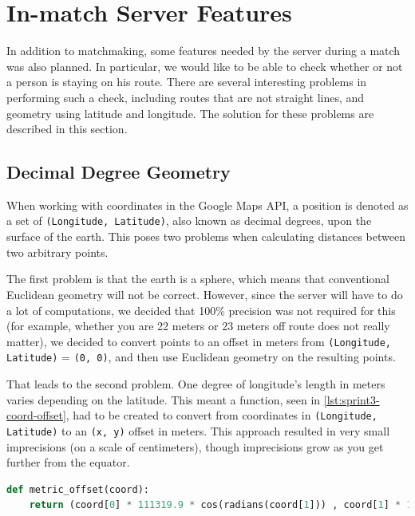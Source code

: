 \section{In-match Server Features}
\label{sec:sprint3-gameserver}

In addition to matchmaking, some features needed by the server during a match was also planned. In particular, we would like to be able to check whether or not a person is staying on his route. There are several interesting problems in performing such a check, including routes that are not straight lines, and geometry using latitude and longitude. The solution for these problems are described in this section.

\subsection{Decimal Degree Geometry}

When working with coordinates in the Google Maps \ac{API}, a position is denoted as a set of \texttt{(Longitude, Latitude)}, also known as decimal degrees, upon the surface of the earth. This poses two problems when calculating distances between two arbitrary points.

The first problem is that the earth is a sphere, which means that conventional Euclidean geometry will not be correct. However, since the server will have to do a lot of computations, we decided that 100\% precision was not required for this (for example, whether you are 22 meters or 23 meters off route does not really matter), we decided to convert points to an offset in meters from \texttt{(Longitude, Latitude)} = \texttt{(0, 0)}, and then use Euclidean geometry on the resulting points.

That leads to the second problem. One degree of longitude's length in meters varies depending on the latitude\cite{wikidecimaldegrees}. This meant a function, seen in \autoref{lst:sprint3-coord-offset}, had to be created to convert from coordinates in \texttt{(Longitude, Latitude)} to an \texttt{(x, y)} offset in meters. This approach resulted in very small imprecisions (on a scale of centimeters), though imprecisions grow as you get further from the equator.

\begin{lstlisting}[label={lst:sprint3-coord-offset},caption={Convert Decimal Degrees to Offset in Meters},language={Python}]
def metric_offset(coord):
	return (coord[0] * 111319.9 * cos(radians(coord[1])) , coord[1] * 111319.9)
\end{lstlisting}

